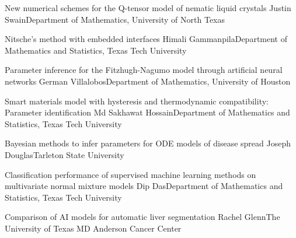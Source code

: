 \begin{postersPG}
\item\poster %
{New numerical schemes for the Q-tensor model of nematic liquid crystals}
{Justin Swain}{Department of Mathematics, University of North Texas}

\item\poster %
{Nitsche’s method with embedded interfaces}
{Himali Gammanpila}{Department of Mathematics and Statistics, Texas Tech University}

\item\poster %
{Parameter inference for the Fitzhugh-Nagumo model through artificial neural networks}
{German Villalobos}{Department of Mathematics, University of Houston}

\item\poster %
{Smart materials model with hysteresis and thermodynamic compatibility: Parameter identification}
{Md Sakhawat Hossain}{Department of Mathematics and Statistics, Texas Tech University}


\item\poster %
{Bayesian methods to infer parameters for ODE models of disease spread}
{Joseph Douglas}{Tarleton State University}

\item\poster %
{Classification performance of supervised machine learning methods on multivariate normal mixture models}
{Dip Das}{Department of Mathematics and Statistics, Texas Tech University}


\item\poster %
{Comparison of AI models for automatic liver segmentation}
{Rachel Glenn}{The University of Texas MD Anderson Cancer Center }




\end{postersPG}

\room



